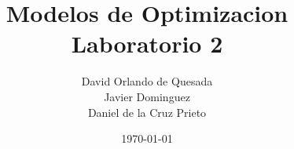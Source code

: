 \documentclass[]{article}
\begin{document}
\title{\bf  Modelos de Optimizacion Laboratorio 2}          
\author{David Orlando de Quesada \\ Javier Dominguez \\ Daniel de la Cruz Prieto   }                        
\date{\today} 

\maketitle 
\end{document}
